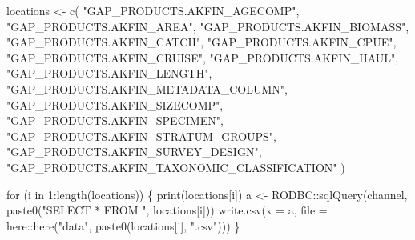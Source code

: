 \documentclass[
  letterpaper,
  oneside,
  open=any]{scrbook}
\newenvironment{Shaded}{\begin{snugshade}}{\end{snugshade}}
\newcommand{\AttributeTok}[1]{\textcolor[rgb]{0.40,0.45,0.13}{#1}}
\newcommand{\ControlFlowTok}[1]{\textcolor[rgb]{0.00,0.23,0.31}{#1}}
\newcommand{\DecValTok}[1]{\textcolor[rgb]{0.68,0.00,0.00}{#1}}
\newcommand{\FunctionTok}[1]{\textcolor[rgb]{0.28,0.35,0.67}{#1}}
\newcommand{\NormalTok}[1]{\textcolor[rgb]{0.00,0.23,0.31}{#1}}
\newcommand{\OtherTok}[1]{\textcolor[rgb]{0.00,0.23,0.31}{#1}}
\newcommand{\SpecialCharTok}[1]{\textcolor[rgb]{0.37,0.37,0.37}{#1}}
\newcommand{\StringTok}[1]{\textcolor[rgb]{0.13,0.47,0.30}{#1}}
\begin{document}
\begin{Shaded}
\begin{Highlighting}[]
\NormalTok{locations }\OtherTok{\textless{}{-}} \FunctionTok{c}\NormalTok{(}
  \StringTok{"GAP\_PRODUCTS.AKFIN\_AGECOMP"}\NormalTok{, }
  \StringTok{"GAP\_PRODUCTS.AKFIN\_AREA"}\NormalTok{, }
  \StringTok{"GAP\_PRODUCTS.AKFIN\_BIOMASS"}\NormalTok{, }
  \StringTok{"GAP\_PRODUCTS.AKFIN\_CATCH"}\NormalTok{, }
  \StringTok{"GAP\_PRODUCTS.AKFIN\_CPUE"}\NormalTok{, }
  \StringTok{"GAP\_PRODUCTS.AKFIN\_CRUISE"}\NormalTok{, }
  \StringTok{"GAP\_PRODUCTS.AKFIN\_HAUL"}\NormalTok{, }
  \StringTok{"GAP\_PRODUCTS.AKFIN\_LENGTH"}\NormalTok{, }
  \StringTok{"GAP\_PRODUCTS.AKFIN\_METADATA\_COLUMN"}\NormalTok{, }
  \StringTok{"GAP\_PRODUCTS.AKFIN\_SIZECOMP"}\NormalTok{, }
  \StringTok{"GAP\_PRODUCTS.AKFIN\_SPECIMEN"}\NormalTok{, }
  \StringTok{"GAP\_PRODUCTS.AKFIN\_STRATUM\_GROUPS"}\NormalTok{, }
  \StringTok{"GAP\_PRODUCTS.AKFIN\_SURVEY\_DESIGN"}\NormalTok{, }
  \StringTok{"GAP\_PRODUCTS.AKFIN\_TAXONOMIC\_CLASSIFICATION"}
\NormalTok{)}

\ControlFlowTok{for}\NormalTok{ (i }\ControlFlowTok{in} \DecValTok{1}\SpecialCharTok{:}\FunctionTok{length}\NormalTok{(locations)) \{}
  \FunctionTok{print}\NormalTok{(locations[i])}
\NormalTok{  a }\OtherTok{\textless{}{-}}\NormalTok{ RODBC}\SpecialCharTok{::}\FunctionTok{sqlQuery}\NormalTok{(channel, }\FunctionTok{paste0}\NormalTok{(}\StringTok{"SELECT * FROM "}\NormalTok{, locations[i]))}
  \FunctionTok{write.csv}\NormalTok{(}\AttributeTok{x =}\NormalTok{ a, }\AttributeTok{file =}\NormalTok{ here}\SpecialCharTok{::}\FunctionTok{here}\NormalTok{(}\StringTok{"data"}\NormalTok{, }\FunctionTok{paste0}\NormalTok{(locations[i], }\StringTok{".csv"}\NormalTok{)))}
\NormalTok{\}}
\end{Highlighting}
\end{Shaded}
\end{document}

